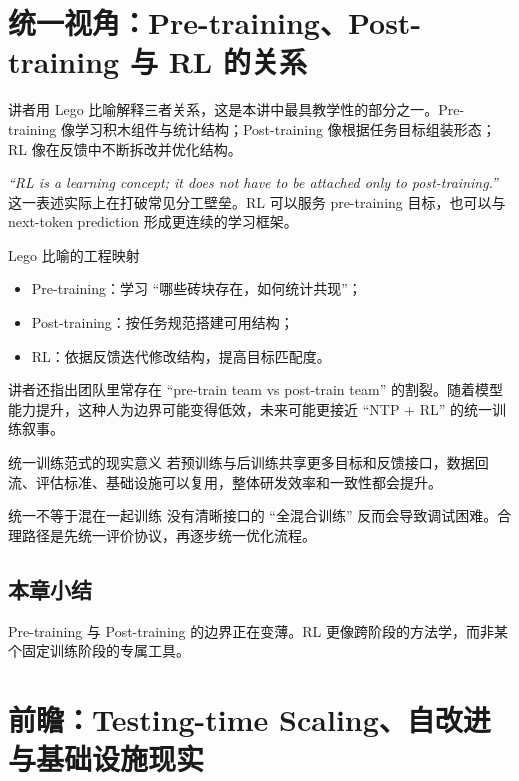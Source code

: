 \documentclass[a4paper]{article}
\begin{document}
\section{统一视角：Pre-training、Post-training 与 RL 的关系}

讲者用 Lego 比喻解释三者关系，这是本讲中最具教学性的部分之一。Pre-training 像学习积木组件与统计结构；Post-training 像根据任务目标组装形态；RL 像在反馈中不断拆改并优化结构。

\textit{``RL is a learning concept; it does not have to be attached only to post-training.''} 这一表述实际上在打破常见分工壁垒。RL 可以服务 pre-training 目标，也可以与 next-token prediction 形成更连续的学习框架。

\begin{knowledgebox}{Lego 比喻的工程映射}
\begin{itemize}
    \item Pre-training：学习 ``哪些砖块存在，如何统计共现''；
    \item Post-training：按任务规范搭建可用结构；
    \item RL：依据反馈迭代修改结构，提高目标匹配度。
\end{itemize}
\end{knowledgebox}

讲者还指出团队里常存在 ``pre-train team vs post-train team'' 的割裂。随着模型能力提升，这种人为边界可能变得低效，未来可能更接近 ``NTP + RL'' 的统一训练叙事。

\begin{importantbox}{统一训练范式的现实意义}
若预训练与后训练共享更多目标和反馈接口，数据回流、评估标准、基础设施可以复用，整体研发效率和一致性都会提升。
\end{importantbox}

\begin{warningbox}{统一不等于混在一起训练}
没有清晰接口的 ``全混合训练'' 反而会导致调试困难。合理路径是先统一评价协议，再逐步统一优化流程。
\end{warningbox}

\subsection{本章小结}
Pre-training 与 Post-training 的边界正在变薄。RL 更像跨阶段的方法学，而非某个固定训练阶段的专属工具。

\section{前瞻：Testing-time Scaling、自改进与基础设施现实}
\end{document}

